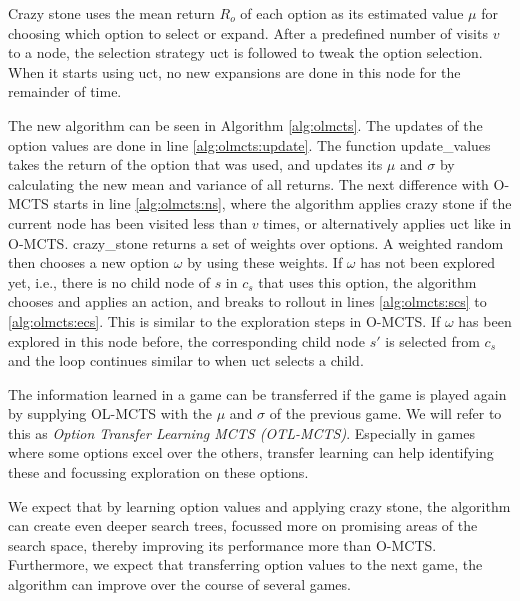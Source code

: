 Crazy stone uses the mean return $R_o$ of each option as its estimated value
$\mu$ for choosing which option to select or expand. After a predefined number
of visits $v$ to a node, the selection strategy \textsf{uct} is followed to
tweak the option selection. When it starts using \textsf{uct}, no new expansions
are done in this node for the remainder of time.

The new algorithm can be seen in Algorithm \ref{alg:olmcts}. The updates of the
option values are done in line \ref{alg:olmcts:update}. The function
\textsf{update\_values} takes the return of the option that was used, and
updates its $\mu$ and $\sigma$ by calculating the new mean and variance of all
returns. The next difference with O-MCTS starts in line \ref{alg:olmcts:ns},
where the algorithm applies crazy stone if the current node has been visited
less than $v$ times, or alternatively applies \textsf{uct} like in O-MCTS.
\textsf{crazy\_stone} returns a set of weights over options. A weighted random
then chooses a new option $\omega$ by using these weights.  If $\omega$ has not
been explored yet, i.e., there is no child node of $s$ in $c_s$ that uses this
option, the algorithm chooses and applies an action, and breaks to rollout in
lines \ref{alg:olmcts:scs} to \ref{alg:olmcts:ecs}. This is similar to the
exploration steps in O-MCTS. If $\omega$ has been explored in this node before,
the corresponding child node $s'$ is selected from $c_s$ and the loop continues
similar to when \textsf{uct} selects a child.

The information learned in a game can be transferred if the game is played
again by supplying OL-MCTS with the $\mu$ and $\sigma$ of the previous game. We
will refer to this as \emph{Option Transfer Learning MCTS (OTL-MCTS)}. Especially
in games where some options excel over the others, transfer learning can help
identifying these and focussing exploration on these options. 

We expect that by learning option values and applying crazy stone, the algorithm
can create even deeper search trees, focussed more on promising areas of the
search space, thereby improving its performance more than O-MCTS. Furthermore,
we expect that transferring option values to the next game, the algorithm can
improve over the course of several games.

